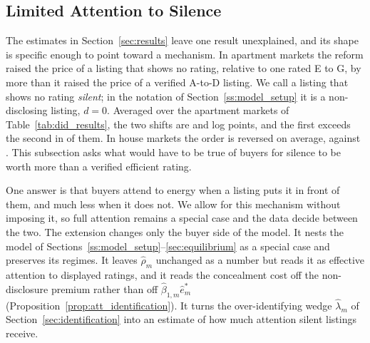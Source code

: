 
\subsection{Limited Attention to Silence}
\label{ss:attention}

The estimates in Section~\ref{sec:results} leave one result unexplained, and its shape is specific enough to point toward a mechanism. In apartment markets the reform raised the price of a listing that shows no rating, relative to one rated E to G, by more than it raised the price of a verified A-to-D listing. We call a listing that shows no rating \emph{silent}; in the notation of Section~\ref{ss:model_setup} it is a non-disclosing listing, $d=0$. Averaged over the \attNMarketsApt{} apartment markets of Table~\ref{tab:did_results}, the two shifts are \attDthreeApt{} and \attBthreeApt{} log points, and the first exceeds the second in \attNDgtBApt{} of them. In house markets the order is reversed on average, \attDthreeHouse{} against \attBthreeHouse{}. This subsection asks what would have to be true of buyers for silence to be worth more than a verified efficient rating.

One answer is that buyers attend to energy when a listing puts it in front of them, and much less when it does not. We allow for this mechanism without imposing it, so full attention remains a special case and the data decide between the two. The extension changes only the buyer side of the model. It nests the model of Sections~\ref{ss:model_setup}--\ref{sec:equilibrium} as a special case and preserves its regimes. It leaves $\hat\rho_m$ unchanged as a number but reads it as effective attention to displayed ratings, and it reads the concealment cost off the non-disclosure premium rather than off $\hat\beta_{1,m}\hat e^*_m$ (Proposition~\ref{prop:att_identification}). It turns the over-identifying wedge $\hat\lambda_m$ of Section~\ref{sec:identification} into an estimate of how much attention silent listings receive.

